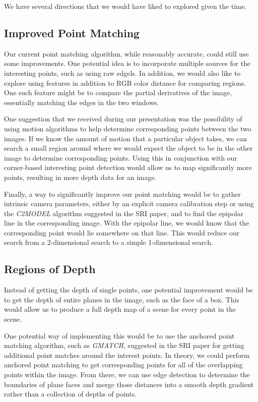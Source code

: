 We have several directions that we would have liked to explored given the time. 

\subsection{Improved Point Matching}
Our current point matching algorithm, while reasonably accurate, could still use some improvements. One potential idea is to incorporate multiple sources for the interesting points, such as using raw edgels. In addition, we would also like to explore using features in addition to RGB color distance for comparing regions. One such feature might be to compare the partial derivatives of the image, essentially matching the edges in the two windows. 

One suggestion that we received during our presentation was the possibility of using motion algorithms to help determine corresponding points between the two images. If we know the amount of motion that a particular object takes, we can search a small region around where we would expect the object to be in the other image to determine corresponding points. Using this in conjunction with our corner-based interesting point detection would allow us to map significantly more points, resulting in more depth data for an image. 

Finally, a way to significantly improve our point matching would be to gather intrinsic camera parameters, either by an explicit camera calibration step or using the \textit{C2MODEL} algorithm suggested in the SRI paper, and to find the epipolar line in the corresponding image. With the epipolar line, we would know that the corresponding point would lie somewhere on that line. This would reduce our search from a 2-dimensional search to a simple 1-dimensional search.

\subsection{Regions of Depth}
Instead of getting the depth of single points, one potential improvement would be to get the depth of entire planes in the image, such as the face of a box. This would allow us to produce a full depth map of a scene for every point in the scene.

One potential way of implementing this would be to use the anchored point matching algorithm, such as \textit{GMATCH}, suggested in the SRI paper for getting additional point matches around the interest points. In theory, we could perform anchored point matching to get corresponding points for all of the overlapping points within the image. From there, we can use edge detection to determine the boundaries of plane faces and merge those distances into a smooth depth gradient rather than a collection of depths of points. 

